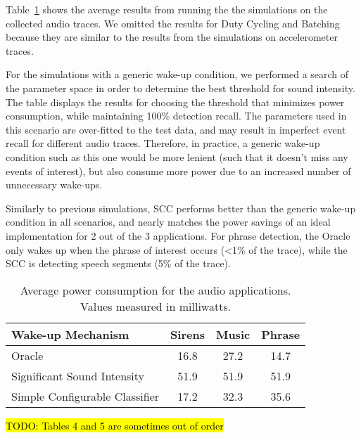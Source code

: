 Table~\ref{table:macrobenchmarksAudio} shows the average results from running the
the simulations on the collected audio traces.  We omitted the results
for Duty Cycling and Batching because they are similar to the results from
the simulations on accelerometer traces.

For the simulations with a generic wake-up condition, we performed a search
of the parameter space in order to determine the best threshold for sound 
intensity.  The table displays the results for choosing the threshold that
minimizes power consumption, while maintaining 100\% detection recall.
The parameters used in this scenario are over-fitted to the test data, and 
may result in imperfect event recall for different audio traces.  Therefore, 
in practice, a generic wake-up condition such as this one would be more 
lenient (such that it doesn't miss any events of interest), but also consume
more power due to an increased number of unnecessary wake-ups.

Similarly to previous simulations, SCC performs better than the generic
wake-up condition in all scenarios, and nearly matches the power savings of an ideal 
implementation for 2 out of the 3 applications.  For phrase detection, the Oracle
only wakes up when the phrase of interest occurs (<1\% of the trace), while
the SCC is detecting speech segments (5\% of the trace).

\begin{table}[t]
\centering
{\small
	\begin{tabular}{|l|c|c|c|}
	\hline
	\textbf{Wake-up Mechanism}     & \textbf{Sirens}   & \textbf{Music}   & \textbf{Phrase} \\ \hline
	Oracle                          & 16.8              & 27.2             & 14.7            \\ \hline
	Significant Sound Intensity    & 51.9              & 51.9             & 51.9            \\ \hline
	Simple Configurable Classifier & 17.2              & 32.3             & 35.6            \\ \hline         
	\end{tabular}
}
\caption{Average power consumption for the audio applications.  Values measured in milliwatts.}
\label{table:macrobenchmarksAudio}
\end{table}

\hl{TODO: Tables 4 and 5 are sometimes out of order}
